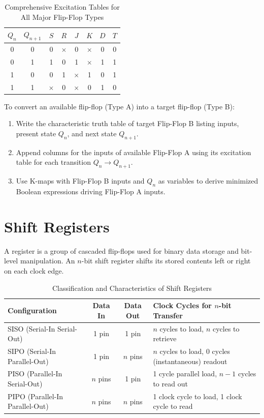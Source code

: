 \begin{table}[htbp]
\centering
\caption{Comprehensive Excitation Tables for All Major Flip-Flop Types}
\label{tab:excitation-tables}
\begin{tabularx}{\textwidth}{c c | c c | c c | c | c}
\toprule
$Q_n$ & $Q_{n+1}$ & $S$ & $R$ & $J$ & $K$ & $D$ & $T$ \\
\midrule
0 & 0 & 0 & $\times$ & 0 & $\times$ & 0 & 0 \\
0 & 1 & 1 & 0 & 1 & $\times$ & 1 & 1 \\
1 & 0 & 0 & 1 & $\times$ & 1 & 0 & 1 \\
1 & 1 & $\times$ & 0 & $\times$ & 0 & 1 & 0 \\
\bottomrule
\end{tabularx}
\end{table}

\begin{conceptbox}
To convert an available flip-flop (Type A) into a target flip-flop (Type B):
\begin{enumerate}
    \item Write the characteristic truth table of target Flip-Flop B listing inputs, present state $Q_n$, and next state $Q_{n+1}$.
    \item Append columns for the inputs of available Flip-Flop A using its excitation table for each transition $Q_n \to Q_{n+1}$.
    \item Use K-maps with Flip-Flop B inputs and $Q_n$ as variables to derive minimized Boolean expressions driving Flip-Flop A inputs.
\end{enumerate}
\end{conceptbox}

\section{Shift Registers}
A register is a group of cascaded flip-flops used for binary data storage and bit-level manipulation. An $n$-bit shift register shifts its stored contents left or right on each clock edge.

\begin{table}[htbp]
\centering
\caption{Classification and Characteristics of Shift Registers}
\label{tab:shift-registers}
\begin{tabularx}{\textwidth}{l c c X}
\toprule
\textbf{Configuration} & \textbf{Data In} & \textbf{Data Out} & \textbf{Clock Cycles for $n$-bit Transfer} \\
\midrule
SISO (Serial-In Serial-Out) & 1 pin & 1 pin & $n$ cycles to load, $n$ cycles to retrieve \\
SIPO (Serial-In Parallel-Out) & 1 pin & $n$ pins & $n$ cycles to load, 0 cycles (instantaneous) readout \\
PISO (Parallel-In Serial-Out) & $n$ pins & 1 pin & 1 cycle parallel load, $n-1$ cycles to read out \\
PIPO (Parallel-In Parallel-Out) & $n$ pins & $n$ pins & 1 clock cycle to load, 1 clock cycle to read \\
\bottomrule
\end{tabularx}
\end{table}

